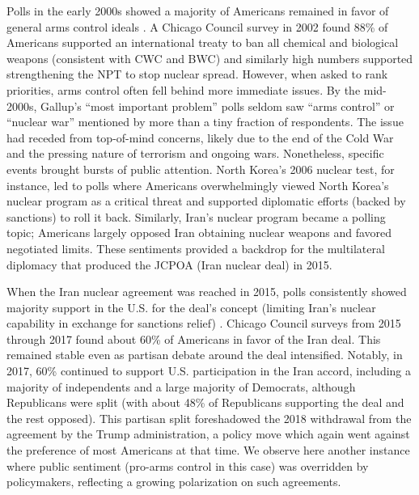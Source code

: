 \documentclass[11,5 pt]{article}
\begin{document}
    Polls in the early 2000s showed a majority of Americans remained in favor of general arms control ideals \cite{ChicagoCouncil2002}. A Chicago Council survey in 2002 found 88\% of Americans supported an international treaty to ban all chemical and biological weapons \cite{ChicagoCouncil2002} (consistent with CWC and BWC) and similarly high numbers supported strengthening the NPT to stop nuclear spread. However, when asked to rank priorities, arms control often fell behind more immediate issues. By the mid-2000s, Gallup’s “most important problem” polls seldom saw “arms control” or “nuclear war” mentioned by more than a tiny fraction of respondents. The issue had receded from top-of-mind concerns, likely due to the end of the Cold War and the pressing nature of terrorism and ongoing wars. Nonetheless, specific events brought bursts of public attention. North Korea’s 2006 nuclear test, for instance, led to polls where Americans overwhelmingly viewed North Korea’s nuclear program as a critical threat and supported diplomatic efforts (backed by sanctions) to roll it back. Similarly, Iran’s nuclear program became a polling topic; Americans largely opposed Iran obtaining nuclear weapons and favored negotiated limits. These sentiments provided a backdrop for the multilateral diplomacy that produced the JCPOA (Iran nuclear deal) in 2015.
    
    When the Iran nuclear agreement was reached in 2015, polls consistently showed majority support in the U.S. for the deal’s concept (limiting Iran’s nuclear capability in exchange for sanctions relief) \cite{GlobalAffairs2017}. Chicago Council surveys from 2015 through 2017 found about 60\% of Americans in favor of the Iran deal. This remained stable even as partisan debate around the deal intensified. Notably, in 2017, 60\% continued to support U.S. participation in the Iran accord, including a majority of independents and a large majority of Democrats, although Republicans were split (with about 48\% of Republicans supporting the deal and the rest opposed). This partisan split foreshadowed the 2018 withdrawal from the agreement by the Trump administration, a policy move which again went against the preference of most Americans at that time. We observe here another instance where public sentiment (pro-arms control in this case) was overridden by policymakers, reflecting a growing polarization on such agreements. 
    
\end{document}
